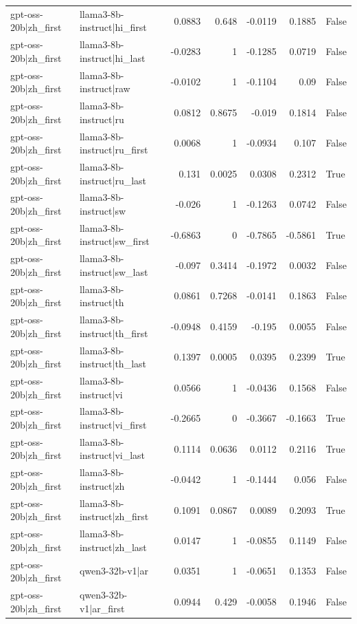 \begin{table}
\begin{tabular}{l l r r r r l}
gpt-oss-20b|zh_first & llama3-8b-instruct|hi_first & 0.0883 & 0.648 & -0.0119 & 0.1885 & False \\
gpt-oss-20b|zh_first & llama3-8b-instruct|hi_last & -0.0283 & 1 & -0.1285 & 0.0719 & False \\
gpt-oss-20b|zh_first & llama3-8b-instruct|raw & -0.0102 & 1 & -0.1104 & 0.09 & False \\
gpt-oss-20b|zh_first & llama3-8b-instruct|ru & 0.0812 & 0.8675 & -0.019 & 0.1814 & False \\
gpt-oss-20b|zh_first & llama3-8b-instruct|ru_first & 0.0068 & 1 & -0.0934 & 0.107 & False \\
gpt-oss-20b|zh_first & llama3-8b-instruct|ru_last & 0.131 & 0.0025 & 0.0308 & 0.2312 & True \\
gpt-oss-20b|zh_first & llama3-8b-instruct|sw & -0.026 & 1 & -0.1263 & 0.0742 & False \\
gpt-oss-20b|zh_first & llama3-8b-instruct|sw_first & -0.6863 & 0 & -0.7865 & -0.5861 & True \\
gpt-oss-20b|zh_first & llama3-8b-instruct|sw_last & -0.097 & 0.3414 & -0.1972 & 0.0032 & False \\
gpt-oss-20b|zh_first & llama3-8b-instruct|th & 0.0861 & 0.7268 & -0.0141 & 0.1863 & False \\
gpt-oss-20b|zh_first & llama3-8b-instruct|th_first & -0.0948 & 0.4159 & -0.195 & 0.0055 & False \\
gpt-oss-20b|zh_first & llama3-8b-instruct|th_last & 0.1397 & 0.0005 & 0.0395 & 0.2399 & True \\
gpt-oss-20b|zh_first & llama3-8b-instruct|vi & 0.0566 & 1 & -0.0436 & 0.1568 & False \\
gpt-oss-20b|zh_first & llama3-8b-instruct|vi_first & -0.2665 & 0 & -0.3667 & -0.1663 & True \\
gpt-oss-20b|zh_first & llama3-8b-instruct|vi_last & 0.1114 & 0.0636 & 0.0112 & 0.2116 & True \\
gpt-oss-20b|zh_first & llama3-8b-instruct|zh & -0.0442 & 1 & -0.1444 & 0.056 & False \\
gpt-oss-20b|zh_first & llama3-8b-instruct|zh_first & 0.1091 & 0.0867 & 0.0089 & 0.2093 & True \\
gpt-oss-20b|zh_first & llama3-8b-instruct|zh_last & 0.0147 & 1 & -0.0855 & 0.1149 & False \\
gpt-oss-20b|zh_first & qwen3-32b-v1|ar & 0.0351 & 1 & -0.0651 & 0.1353 & False \\
gpt-oss-20b|zh_first & qwen3-32b-v1|ar_first & 0.0944 & 0.429 & -0.0058 & 0.1946 & False \\

\end{tabular}
\end{table}
